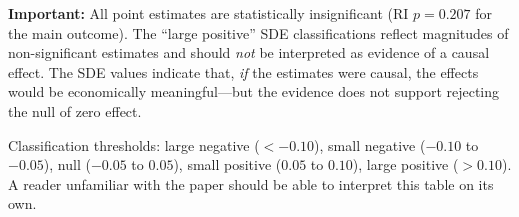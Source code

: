 \documentclass[12pt]{article}
\begin{document}
\begin{table}[H]
{\textbf{Important:} All point estimates are statistically insignificant (RI $p = 0.207$ for the main outcome).
The ``large positive'' SDE classifications reflect magnitudes of non-significant estimates
and should \emph{not} be interpreted as evidence of a causal effect.
The SDE values indicate that, \emph{if} the estimates were causal, the effects would be economically
meaningful---but the evidence does not support rejecting the null of zero effect.

Classification thresholds:
large negative ($< -0.10$), small negative ($-0.10$ to $-0.05$),
null ($-0.05$ to $0.05$), small positive ($0.05$ to $0.10$),
large positive ($> 0.10$).
A reader unfamiliar with the paper should be able to interpret this table
on its own.}
\end{table}
\end{document}

